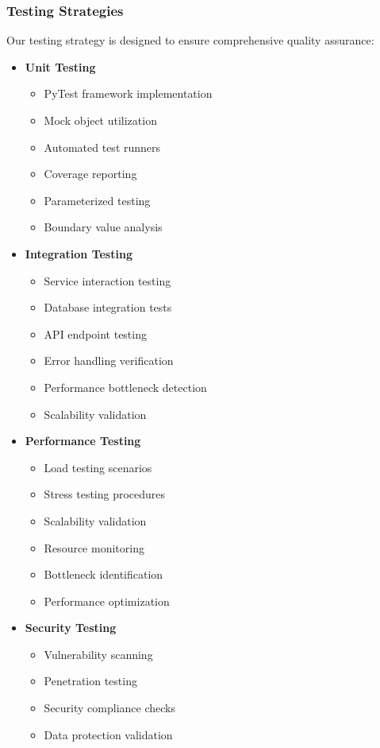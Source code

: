 \documentclass[12pt,a4paper]{report}
\begin{document}
\subsubsection{Testing Strategies}
Our testing strategy is designed to ensure comprehensive quality assurance:

\begin{itemize}
    \item \textbf{Unit Testing}
    \begin{itemize}
        \item PyTest framework implementation
        \item Mock object utilization
        \item Automated test runners
        \item Coverage reporting
        \item Parameterized testing
        \item Boundary value analysis
    \end{itemize}
    
    \item \textbf{Integration Testing}
    \begin{itemize}
        \item Service interaction testing
        \item Database integration tests
        \item API endpoint testing
        \item Error handling verification
        \item Performance bottleneck detection
        \item Scalability validation
    \end{itemize}
    
    \item \textbf{Performance Testing}
    \begin{itemize}
        \item Load testing scenarios
        \item Stress testing procedures
        \item Scalability validation
        \item Resource monitoring
        \item Bottleneck identification
        \item Performance optimization
    \end{itemize}
    
    \item \textbf{Security Testing}
    \begin{itemize}
        \item Vulnerability scanning
        \item Penetration testing
        \item Security compliance checks
        \item Data protection validation
    \end{itemize}
\end{itemize}
\end{document}

